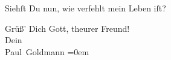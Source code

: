 \pstart
           Siehſt Du nun, wie verfehlt mein Leben iſt?\pend
           
\pstart
           Grüß’ Dich Gott, theurer Freund!{\\[\baselineskip]}Dein{\\[\baselineskip]}\spacefill\mbox{Paul Goldmann}\pend
           \leftskip=0em{}\endnumbering{}  \newcommand{\dateiname}{L02628}\newcommand{\titel}{Paul Goldmann an Arthur Schnitzler, 18. 12. [1894]}\newcommand{\editorInnen}{Martin Anton Müller und Laura Untner}
